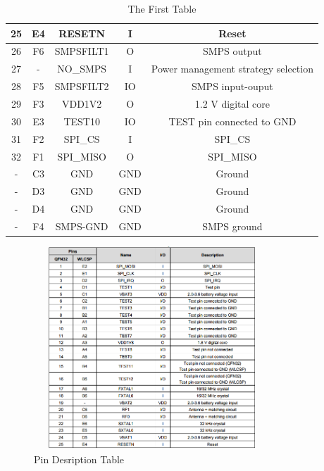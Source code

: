 \begin{table}
{\begin{tabular}{|c | c | c | c | c|}
		\hline
		25 & E4 & RESETN & I & Reset\\
		\hline
		26 & F6 & SMPSFILT1 & O &  SMPS output\\
		\hline
		27 & - & NO\_SMPS & I & Power management strategy selection\\
		\hline
		28 & F5 & SMPSFILT2 & IO & SMPS input-ouput\\
		\hline
		29 & F3 & VDD1V2 & O & 1.2 V digital core\\
		\hline
		30 & E3 & TEST10 & IO & TEST pin connected to GND\\
		\hline
		31 & F2 & SPI\_CS & I & SPI\_CS\\
		\hline
		32 & F1 & SPI\_MISO & O & SPI\_MISO\\
		\hline
		- & C3 & GND & GND & Ground\\
		\hline
		- & D3 & GND & GND & Ground\\
		\hline
		- & D4 & GND & GND & Ground\\
		\hline
		- & F4 & SMPS-GND & GND & SMPS ground\\
	\bottomrule
	\end{tabular}}
	\caption{The First Table}
\end{table}
\begin{figure}[ht]
	\centering
	\includegraphics[width=3.5in, height=3in]{images/pin_table1.png}
	\caption{Pin Desription Table}
\end{figure}
